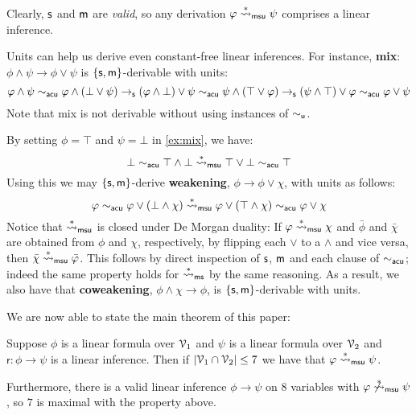\documentclass[a4paper, UKenglish, cleveref]{lipics-v2019}
\begin{document}
Clearly, $\mathsf{s}$ and $\mathsf{m}$ are \emph{valid}, so any derivation $\varphi \overset{*}{\rightsquigarrow}_{\mathsf{msu}} \psi$ comprises a linear inference.


\begin{example}
[`Mix']
\label{ex:mix}
Units can help us derive even constant-free linear inferences.
For instance, \textbf{mix}: \(\phi \land \psi \to \phi \lor \psi\) is $\{\mathsf{s},\mathsf{m}\}$-derivable with units:
  \[\varphi \land \psi \sim_{\mathsf{acu}} \varphi \land (\bot \lor \psi) \to_{\mathsf{s}} (\varphi \land \bot) \lor \psi \sim_{\mathsf{acu}} \psi \land (\top \lor \varphi) \to_{\mathsf{s}} (\psi \land \top) \lor \varphi \sim_{\mathsf{acu}} \varphi \lor \psi\]
  Note that mix is not derivable without using instances of $\sim_{\mathsf{u}}$.
\end{example}

\begin{example}
\label{example-weakening-duality}
By setting $\phi = \top$ and $\psi = \bot$ in \cref{ex:mix}, we have:
\[
\bot \sim_{\mathsf{acu}} \top \land \bot \overset{*}{\rightsquigarrow}_{\mathsf{msu}} \top \lor \bot \sim_{\mathsf{acu}} \top
\]
Using this we may $\{\mathsf{s},\mathsf{m}\}$-derive \textbf{weakening}, $\phi \to \phi \lor \chi$, with units as follows:
\[
\varphi \sim_{\mathsf{acu}} \varphi \lor (\bot \land \chi) \overset{*}{\rightsquigarrow}_{\mathsf{msu}} \varphi \lor (\top \land \chi) \sim_{\mathsf{acu}} \varphi \lor \chi
\]
Notice that $\overset{*}{\rightsquigarrow}_{\mathsf{msu}}$ is closed under De Morgan duality:
If $\varphi \overset{*}{\rightsquigarrow}_{\mathsf{msu}} \chi$ and $\bar \phi$ and $\bar \chi$ are obtained from $\phi$ and $\chi$, respectively, by flipping each $\lor$ to a $\land$ and vice versa, then $\bar \chi\overset{*}{\rightsquigarrow}_{\mathsf{msu}} \bar {\varphi}$.
This follows by direct inspection of $\mathsf{s}$, $\mathsf{m}$ and each clause of $\sim_{\mathsf{acu}}$; indeed the same property holds for $\overset{*}{\rightsquigarrow}_{\mathsf{ms}}$ by the same reasoning.
%
As a result, we also have that \textbf{coweakening}, $\phi \land \chi \to \phi$, is $\{\mathsf{s},\mathsf{m}\}$-derivable with units.
\end{example}

We are now able to state the main theorem of this paper:
\begin{theorem}
  \label{thm:main}
  Suppose \(\phi\) is a linear formula over \(\mathcal{V}_1\) and \(\psi\) is a linear formula over \(\mathcal{V}_2\) and \(\mathsf r : \phi \to \psi\) is a linear inference. Then if \(|\mathcal{V}_1 \cap \mathcal{V}_2| \leq 7\) we have that \(\varphi \overset{*}{\rightsquigarrow}_{\mathsf{msu}} \psi\).

  Furthermore, there is a valid linear inference \(\phi \to \psi\) on \(8\) variables with \(\varphi \not \overset{*}{\rightsquigarrow}_{\mathsf{msu}} \psi\), so \(7\) is maximal with the property above.
\end{theorem}
\end{document}
